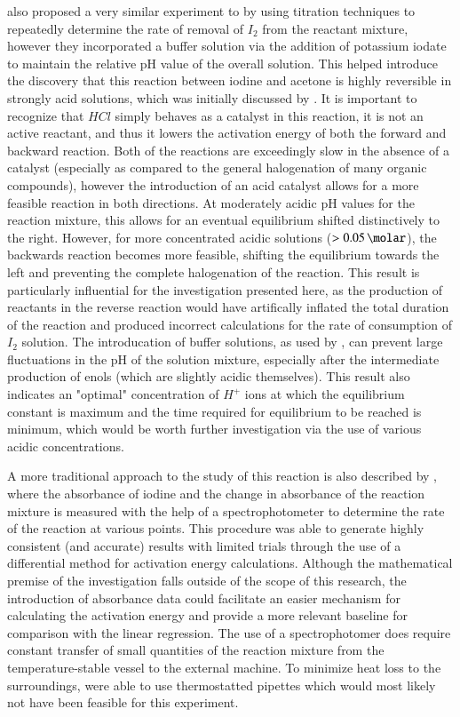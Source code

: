 \textcite{reversiblity} also proposed a very similar experiment to \textcite{other_literature_1} by using titration techniques to repeatedly determine the rate of removal of $I_2$ from the reactant mixture, however they incorporated a buffer solution via the addition of potassium iodate to maintain the relative pH value of the overall solution. This helped introduce the discovery that this reaction between iodine and acetone is highly reversible in strongly acid solutions, which was initially discussed by \textcite{reversibility_find}. It is important to recognize that $HCl$ simply behaves as a catalyst in this reaction, it is not an active reactant, and thus it lowers the activation energy of both the forward and backward reaction. Both of the reactions are exceedingly slow in the absence of a catalyst (especially as compared to the general halogenation of many organic compounds), however the introduction of an acid catalyst allows for a more feasible reaction in both directions. At moderately acidic pH values for the reaction mixture, this allows for an eventual equilibrium shifted distinctively to the right. However, for more concentrated acidic solutions ($>\SI{.05}{\molar}$), the backwards reaction becomes more feasible, shifting the equilibrium towards the left and preventing the complete halogenation of the reaction. This result is particularly influential for the investigation presented here, as the production of reactants in the reverse reaction would have artifically inflated the total duration of the reaction and produced incorrect calculations for the rate of consumption of $I_2$ solution. The introducation of buffer solutions, as used by \textcite{reversiblity}, can prevent large fluctuations in the pH of the solution mixture, especially after the intermediate production of enols (which are slightly acidic themselves). This result also indicates an "optimal" concentration of $H^+$ ions at which the equilibrium constant is maximum and the time required for equilibrium to be reached is minimum, which would be worth further investigation via the use of various acidic concentrations.

A more traditional approach to the study of this reaction is also described by \textcite{main_literature}, where the absorbance of iodine and the change in absorbance of the reaction mixture is measured with the help of a spectrophotometer to determine the rate of the reaction at various points. This procedure was able to generate highly consistent (and accurate) results with limited trials through the use of a differential method for activation energy calculations. Although the mathematical premise of the investigation falls outside of the scope of this research, the introduction of absorbance data could facilitate an easier mechanism for calculating the activation energy and provide a more relevant baseline for comparison with the linear regression. The use of a spectrophotomer does require constant transfer of small quantities of the reaction mixture from the temperature-stable vessel to the external machine. To minimize heat loss to the surroundings, \textcite{main_literature} were able to use thermostatted pipettes which would most likely not have been feasible for this experiment.

